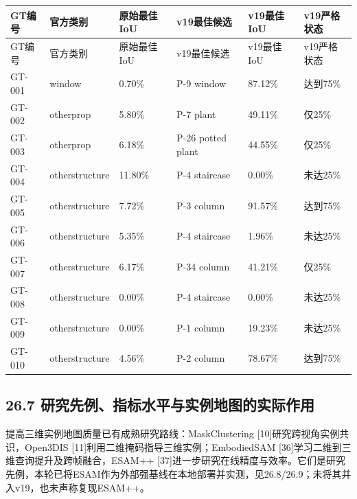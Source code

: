 \documentclass[UTF8,fontset=fandol]{ctexart}
\begin{document}
{\small
\begin{longtable}{|p{}|p{}|p{}|p{}|p{}|p{}|}
\hline
GT编号 & 官方类别 & 原始最佳IoU & v19最佳候选 & v19最佳IoU & v19严格状态 \\ \hline
\endfirsthead
\hline
GT编号 & 官方类别 & 原始最佳IoU & v19最佳候选 & v19最佳IoU & v19严格状态 \\ \hline
\endhead
GT-001 & window & 0.70\% & P-9 window & 87.12\% & 达到75\% \\ \hline
GT-002 & otherprop & 5.80\% & P-7 plant & 49.11\% & 仅25\% \\ \hline
GT-003 & otherprop & 6.18\% & P-26 potted plant & 44.55\% & 仅25\% \\ \hline
GT-004 & otherstructure & 11.80\% & P-4 staircase & 0.00\% & 未达25\% \\ \hline
GT-005 & otherstructure & 7.72\% & P-3 column & 91.57\% & 达到75\% \\ \hline
GT-006 & otherstructure & 5.35\% & P-4 staircase & 1.96\% & 未达25\% \\ \hline
GT-007 & otherstructure & 6.17\% & P-34 column & 41.21\% & 仅25\% \\ \hline
GT-008 & otherstructure & 0.00\% & P-4 staircase & 0.00\% & 未达25\% \\ \hline
GT-009 & otherstructure & 0.00\% & P-1 column & 19.23\% & 未达25\% \\ \hline
GT-010 & otherstructure & 4.56\% & P-2 column & 78.67\% & 达到75\% \\ \hline
\end{longtable}
}

\subsection*{26.7 研究先例、指标水平与实例地图的实际作用}

提高三维实例地图质量已有成熟研究路线：MaskClustering [10]研究跨视角实例共识，Open3DIS [11]利用二维掩码指导三维实例；EmbodiedSAM [36]学习二维到三维查询提升及跨帧融合，ESAM++ [37]进一步研究在线精度与效率。它们是研究先例，本轮已将ESAM作为外部强基线在本地部署并实测，见26.8/26.9；未将其并入v19，也未声称复现ESAM++。
\end{document}
